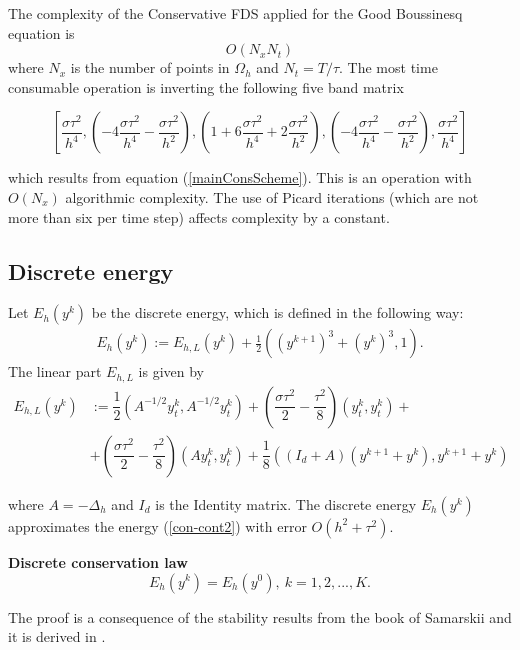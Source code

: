 \documentclass[%
 aip,
cp,  
 amsmath,amssymb,
 reprint,
]{iopconfser}
\newcommand{\rf}[1]{(\ref{#1})}
\begin{document}
The complexity of the Conservative FDS applied for the Good Boussinesq equation is
$$ O( N_x  N_t ) $$
where $N_x$ is the number of points in $\Omega_h$ and $N_t = T/\tau$. The most time consumable operation is inverting the following five band matrix 

$$\left[ \dfrac{\sigma\tau^2}{h^4}, \left(-4\dfrac{\sigma\tau^2}{h^4}-\dfrac{\sigma\tau^2}{h^2}\right), \left(1+6\dfrac{\sigma\tau^2}{h^4}+2\dfrac{\sigma\tau^2}{h^2}\right), \left(-4\dfrac{\sigma\tau^2}{h^4}-\dfrac{\sigma\tau^2}{h^2}\right), \dfrac{\sigma\tau^2}{h^4} \right]$$

which results from equation \rf{mainConsScheme}. This is an operation with $ O( N_x ) $ algorithmic complexity. The use of Picard iterations (which are not more than six per time step) affects complexity by a constant.
\subsection{Discrete energy}

Let $E_h (y^k)$ be the discrete energy, which is defined in the following way:
\begin{eqnarray}\label{energy1}
E_h (y^k):=E_{h,L} (y^k) +\frac{1}{2}((y^{k+1})^3+(y^{k})^3,1).
\end{eqnarray}
The linear part $E_{h,L}$ is given by
\begin{align*}\label{den}
E_{h,L}\left( y^k \right)&:= 
\dfrac{1}{2}\left(A^{-1/2}y_t^k,A^{-1/2}y_t^k\right)+\left(\dfrac{\sigma\tau^2}{2}-\dfrac{\tau^2}{8}\right)\left(y_t^k,y_t^k\right)+\nonumber\\&+\left(\dfrac{\sigma\tau^2}{2}-\dfrac{\tau^2}{8}\right) \left(Ay_t^k,y_t^k\right)
+\dfrac{1}{8}\left(\left(I_d+A\right)\left(y^{k+1}+y^k\right),y^{k+1}+y^k\right)
\end{align*}

where $A=-\Delta_h$ and $I_d$ is the Identity matrix. The discrete energy $E_h (y^k)$ approximates the energy \rf{con-cont2} with error $O(h^2+\tau^2)$.


{\textbf{Discrete conservation law}}
	$$E_h(y^k)=E_h(y^0),~k=1,2,...,K.$$

The proof is a consequence of the stability results from the book of Samarskii \cite{samarski} and it is derived in \cite{consCitat}.
\end{document}
